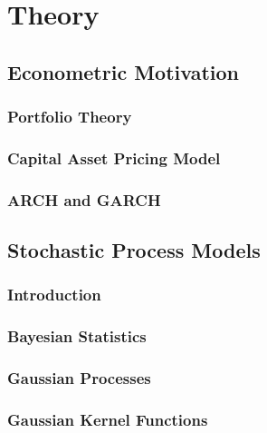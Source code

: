 \chapter{Theory}
\label{sec:grundlagen}

\section{Econometric Motivation}
\subsection{Portfolio Theory}

\label{sec:portfolio}
\cleardoubleoddpage

\subsection{Capital Asset Pricing Model}

\label{sec:capm}
\cleardoubleoddpage

\subsection{ARCH and GARCH}

\label{sec:arch}
\cleardoubleoddpage


\section{Stochastic Process Models}
\subsection{Introduction}

\label{sec:introduction}
\cleardoubleoddpage

\subsection{Bayesian Statistics}

\label{sec:bayes}
\cleardoubleoddpage

\subsection{Gaussian Processes}

\label{sec:gp}
\cleardoubleoddpage

\subsection{Gaussian Kernel Functions}

\label{sec:kernels}
\cleardoubleoddpage

